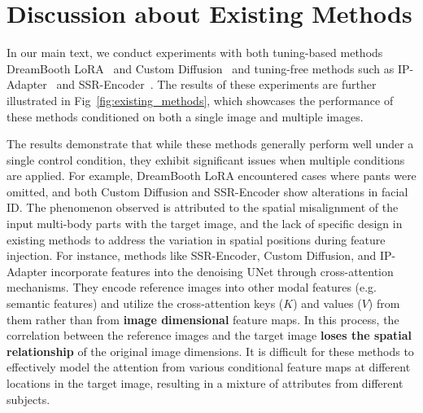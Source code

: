 \section{Discussion about Existing Methods}



In our main text, we conduct experiments with both tuning-based methods DreamBooth LoRA~\cite{ruiz2023dreambooth,hu2021lora} and Custom Diffusion~\cite{kumari2023customdiffusion} and tuning-free methods such as IP-Adapter~\cite{ye2023ipadapter} and SSR-Encoder~\cite{zhang2024ssrencoder}. The results of these experiments are further illustrated in Fig~\ref{fig:existing_methods}, which showcases the performance of these methods conditioned on both a single image and multiple images.

The results demonstrate that while these methods generally perform well under a single control condition, they exhibit significant issues when multiple conditions are applied. For example, DreamBooth LoRA encountered cases where pants were omitted, and both Custom Diffusion and SSR-Encoder show alterations in facial ID. The phenomenon observed is attributed to the spatial misalignment of the input multi-body parts with the target image, and the lack of specific design in existing methods to address the variation in spatial positions during feature injection. For instance, methods like SSR-Encoder, Custom Diffusion, and IP-Adapter incorporate features into the denoising UNet through cross-attention mechanisms. They encode reference images into other modal features (e.g. semantic features) and utilize the cross-attention keys ($K$) and values ($V$) from them rather than from \textbf{image dimensional} feature maps. In this process, the correlation between the reference images and the target image \textbf{loses the spatial relationship} of the original image dimensions. It is difficult for these methods to effectively model the attention from various conditional feature maps at different locations in the target image, resulting in a mixture of attributes from different subjects.

